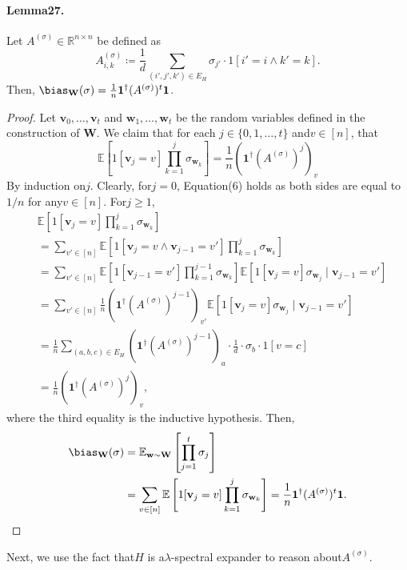 \paragraph{Lemma27.} Let $A^{(\sigma)}\in\mathbb R^{n\times n}$ be defined as
\[A^{(\sigma)}_{i,k}\coloneqq\frac1d\sum_{(i',j',k')\in E_H}\sigma_{j'}\cdot1[i'=i\land k'=k].\]
Then, $\bias_{\mathbf W}(\sigma)=\frac1n\mathbf1^{\dagger}(A^{(\sigma)})^t\mathbf1$.
\begin{proof}
Let $\mathbf v_0,\ldots,\mathbf v_t$ and $\mathbf w_1,\ldots,\mathbf w_t$ be the random variables defined in the construction of $\mathbf W$. We claim that for each $j\in\{0,1,\ldots,t\}$ and$v\in[n]$, that
\[\mathbb E\left[1[\mathbf v_j=v]\prod_{k=1}^j\sigma_{\mathbf w_k}\right]=\frac1n\left(\mathbf1^{\dagger}(A^{(\sigma)})^j\right)_v\tag{6}\]
By induction on$j$. Clearly, for$j=0$, Equation(6) holds as both sides are equal to$1/n$ for any$v\in[n]$. For$j\geq1$,
\begin{align*}
&\mathbb E\left[1[\mathbf v_j=v]\prod_{k=1}^j\sigma_{\mathbf w_k}\right]\\
&=\sum_{v'\in[n]}\mathbb E\left[1[\mathbf v_j=v\land\mathbf v_{j-1}=v']\prod_{k=1}^j\sigma_{\mathbf w_k}\right]\\
&=\sum_{v'\in[n]}\mathbb E\left[1[\mathbf v_{j-1}=v']\prod_{k=1}^{j-1}\sigma_{\mathbf w_k}\right]\mathbb E[1[\mathbf v_j=v]\sigma_{\mathbf w_j}\mid\mathbf v_{j-1}=v']\\
&=\sum_{v'\in[n]}\frac1n\left(\mathbf1^{\dagger}(A^{(\sigma)})^{j-1}\right)_{v'}\mathbb E[1[\mathbf v_j=v]\sigma_{\mathbf w_j}\mid\mathbf v_{j-1}=v']\\
&=\frac1n\sum_{(a,b,c)\in E_H}\left(\mathbf1^{\dagger}(A^{(\sigma)})^{j-1}\right)_a\cdot\frac1d\cdot\sigma_b\cdot1[v=c]\\
&=\frac1n\left(\mathbf1^{\dagger}(A^{(\sigma)})^j\right)_v,
\end{align*}
where the third equality is the inductive hypothesis. Then,
\begin{align*}
\bias_{\mathbf W}(\sigma)&=\mathbb E_{\mathbf w\sim\mathbf W}\left[\prod_{j=1}^t\sigma_j\right]\\
&=\sum_{v\in[n]}\mathbb E\left[1[\mathbf v_j=v]\prod_{k=1}^j\sigma_{\mathbf w_k}\right]=\frac1n\mathbf1^{\dagger}(A^{(\sigma)})^t\mathbf1.
\end{align*}
\end{proof}
Next, we use the fact that$H$ is a$\lambda$-spectral expander to reason about$A^{(\sigma)}$.
